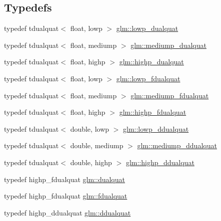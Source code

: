 \subsection*{Typedefs}
\begin{DoxyCompactItemize}
\item 
typedef tdualquat$<$ float, lowp $>$ \hyperlink{group__gtx__dual__quaternion_ga4888200ed911e4887c2423fed74ad362}{glm\+::lowp\+\_\+dualquat}
\item 
typedef tdualquat$<$ float, mediump $>$ \hyperlink{group__gtx__dual__quaternion_gaa88fe93eb823d1aba8d6df8028572cb5}{glm\+::mediump\+\_\+dualquat}
\item 
typedef tdualquat$<$ float, highp $>$ \hyperlink{group__gtx__dual__quaternion_ga98557c3577757f2ced8f35b1de7fa234}{glm\+::highp\+\_\+dualquat}
\item 
typedef tdualquat$<$ float, lowp $>$ \hyperlink{group__gtx__dual__quaternion_ga797f6d2679ab6773c1f057b97bf95111}{glm\+::lowp\+\_\+fdualquat}
\item 
typedef tdualquat$<$ float, mediump $>$ \hyperlink{group__gtx__dual__quaternion_ga93e9def86ffeedd48d9c79a6afacfa6c}{glm\+::mediump\+\_\+fdualquat}
\item 
typedef tdualquat$<$ float, highp $>$ \hyperlink{group__gtx__dual__quaternion_ga8c46d61c38b2b6d9c5091c667dd20fe8}{glm\+::highp\+\_\+fdualquat}
\item 
typedef tdualquat$<$ double, lowp $>$ \hyperlink{group__gtx__dual__quaternion_ga361a2ea6cce1446a8ab7e7803156c16c}{glm\+::lowp\+\_\+ddualquat}
\item 
typedef tdualquat$<$ double, mediump $>$ \hyperlink{group__gtx__dual__quaternion_ga5727116ab20b2a1d40387766d723dd6c}{glm\+::mediump\+\_\+ddualquat}
\item 
typedef tdualquat$<$ double, highp $>$ \hyperlink{group__gtx__dual__quaternion_ga83e4c5d27c8b0a264a3f3aed24f3f84e}{glm\+::highp\+\_\+ddualquat}
\item 
typedef highp\+\_\+fdualquat \hyperlink{group__gtx__dual__quaternion_ga2f6227b5f9dc08a2e7682065a84b3aa9}{glm\+::dualquat}
\item 
typedef highp\+\_\+fdualquat \hyperlink{group__gtx__dual__quaternion_ga436906129bc69ca5059555cafcbac9fd}{glm\+::fdualquat}
\item 
typedef highp\+\_\+ddualquat \hyperlink{group__gtx__dual__quaternion_ga373431ffdd82d5c03c258217a9e1f1a6}{glm\+::ddualquat}
\end{DoxyCompactItemize}
